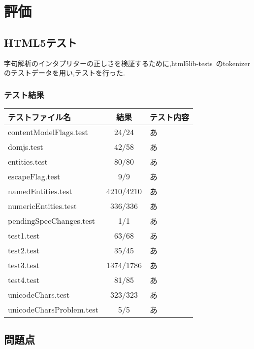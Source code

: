 \documentclass[uplatex,a4j]{jsreport}
\begin{document}
\chapter{評価}
\label{評価}
\section{HTML5テスト}
字句解析のインタプリターの正しさを検証するために,html5lib-tests~\cite{html5lib-tests}のtokenizerのテストデータを用い,テストを行った.
\subsection*{テスト結果}
\begin{table}[htb]
    \begin{tabular}{|l|c|l|} \hline
      テストファイル名 & 結果 & テスト内容\\ \hline 
      contentModelFlags.test & 24/24 & あ\\
      domjs.test & 42/58 & あ\\
      entities.test & 80/80 & あ\\
      escapeFlag.test & 9/9 & あ\\
      namedEntities.test & 4210/4210 & あ\\
      numericEntities.test & 336/336 & あ\\
      pendingSpecChanges.test & 1/1 & あ\\
      test1.test & 63/68 & あ\\
      test2.test & 35/45 & あ\\
      test3.test & 1374/1786 & あ\\
      test4.test & 81/85 & あ\\
      unicodeChars.test & 323/323 & あ\\
      unicodeCharsProblem.test & 5/5 & あ\\ \hline 
    \end{tabular}
\end{table}

\section{問題点}
\end{document}

